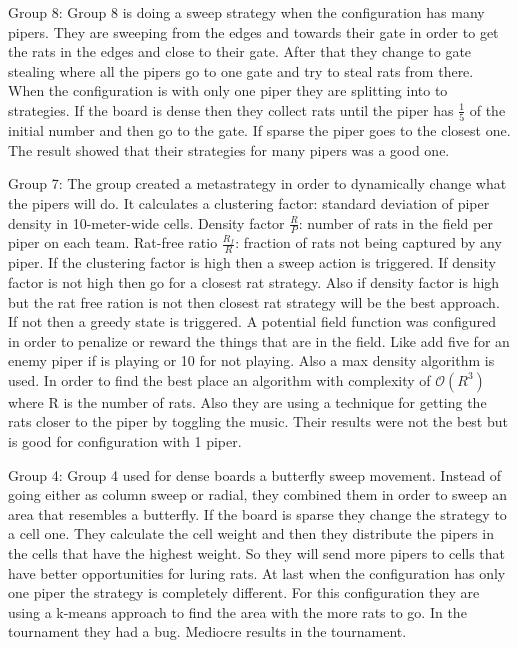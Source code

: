 Group 8:
Group 8 is doing a sweep strategy when the configuration has many pipers. They 
are sweeping from the edges and towards their gate in order to get the rats in 
the edges and close to their gate. After that they change to gate stealing where
all the pipers go to one gate and try to steal rats from there. When the 
configuration is with only one piper they are splitting into to strategies. If 
the board is dense then they collect rats until the piper has $\frac{1}{5}$ of 
the initial number and then go to the gate. If sparse the piper goes to the 
closest one. The result showed that their strategies for many pipers was a good 
one.

Group 7:
The group created a metastrategy in order to dynamically change what the pipers 
will do. It calculates a clustering factor: standard deviation of piper density 
in 10-meter-wide cells. Density factor $\frac{R}{P}$: number of rats in the field 
per piper on each team. Rat-free ratio $\frac{R_f}{R}$: fraction of rats not being 
captured by any piper. If the clustering factor is high then a sweep action is
triggered. If density factor is not high then go for a closest rat strategy. Also
if density factor is high but the rat free ration is not then closest rat strategy
will be the best approach. If not then a greedy state is triggered. A potential
field function was configured in order to penalize or reward the things that are
in the field. Like add five for an enemy piper if is playing or 10 for not playing.
Also a max density algorithm is used. In order to find the best place an algorithm
with complexity of $\mathcal{O}(R^3)$ where R is the number of rats. Also they
are using a technique for getting the rats closer to the piper by toggling the
music. Their results were not the best but is good for configuration with 1 piper.

Group 4:
Group 4 used for dense boards a butterfly sweep movement. Instead of going either
as column sweep or radial, they combined them in order to sweep an area that 
resembles a butterfly. If the board is sparse they change the strategy to a cell
one. They calculate the cell weight and then they distribute the pipers in the 
cells that have the highest weight. So they will send more pipers to cells that
have better opportunities for luring rats. At last when the configuration has
only one piper the strategy is completely different. For this configuration they
are using a k-means approach to find the area with the more rats to go. In the 
tournament they had a bug. Mediocre results in the tournament.
